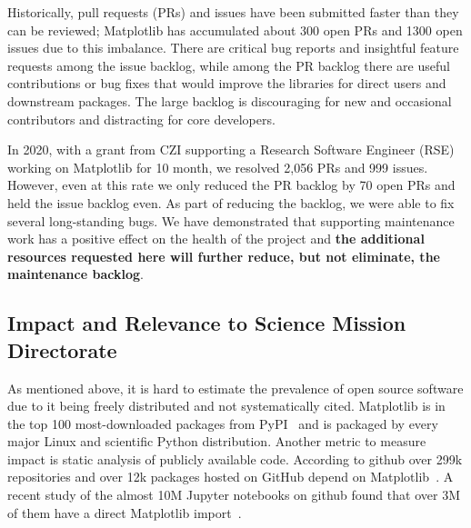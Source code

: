 \documentclass[12pt]{article}
\numberwithin{page}{section}
\begin{document}
Historically, pull requests (PRs) and issues have been submitted
faster than they can be reviewed; Matplotlib has accumulated about 300
open PRs and 1300 open issues due to this imbalance. There are
critical bug reports and insightful feature requests among the issue
backlog, while among the PR backlog there are useful contributions or
bug fixes that would improve the libraries for direct users and
downstream packages.  The large backlog is discouraging for new and
occasional contributors and distracting for core developers.

In 2020, with a grant from CZI supporting a Research Software Engineer
(RSE) working on Matplotlib for 10 month, we resolved 2,056 PRs and
999 issues.  However, even at this rate we only reduced the PR backlog
by 70 open PRs and held the issue backlog even.  As part of reducing
the backlog, we were able to fix several long-standing bugs.  We have
demonstrated that supporting maintenance work has a positive effect on
the health of the project and \textbf{the additional resources
  requested here will further reduce, but not eliminate, the
  maintenance backlog}.



\subsection{Impact and Relevance to Science Mission Directorate}

As mentioned above, it is hard to estimate the prevalence of open
source software due to it being freely distributed and not
systematically cited.  Matplotlib is in the top 100 most-downloaded
packages from PyPI~\cite{pypi_stats} and is packaged by every major
Linux and scientific Python distribution.  Another metric to measure
impact is static analysis of publicly available code.  According to
github over 299k repositories and over 12k packages hosted on GitHub
depend on Matplotlib~\cite{gh_deps:2021}. A recent study of the
almost 10M Jupyter notebooks on github found that over 3M of them have
a direct Matplotlib import~\cite{datalore:2020}.
\end{document}
